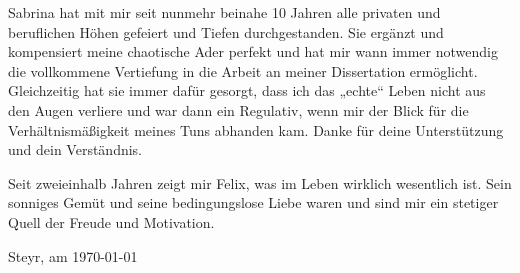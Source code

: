 Sabrina hat mit mir seit nunmehr beinahe 10 Jahren alle privaten und beruflichen Höhen gefeiert und Tiefen durchgestanden. Sie ergänzt und kompensiert meine chaotische Ader perfekt und hat mir wann immer notwendig die vollkommene Vertiefung in die Arbeit an meiner Dissertation ermöglicht. Gleichzeitig hat sie immer dafür gesorgt, dass ich das „echte“ Leben nicht aus den Augen verliere und war dann ein Regulativ, wenn mir der Blick für die Verhältnismäßigkeit meines Tuns abhanden kam. Danke für deine Unterstützung und dein Verständnis.

Seit zweieinhalb Jahren zeigt mir Felix, was im Leben wirklich wesentlich ist. Sein sonniges Gemüt und seine bedingungslose Liebe waren und sind mir ein stetiger Quell der Freude und Motivation. 

\begin{flushright}
 Steyr, am \today
\end{flushright}


